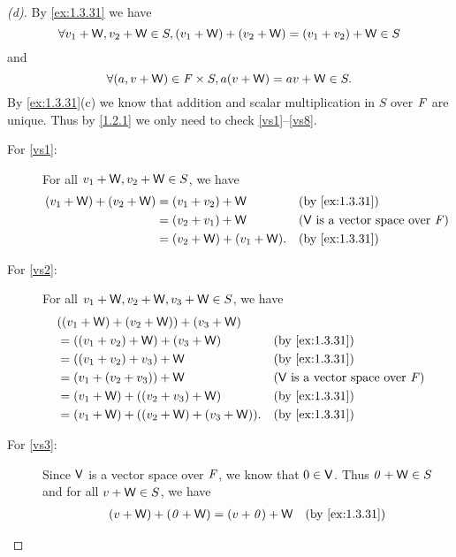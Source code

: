 \begin{proof}[(d)]
  By \cref{ex:1.3.31} we have
  \[
    \forall v_1 + \mathsf{W}, v_2 + \mathsf{W} \in S, (v_1 + \mathsf{W}) + (v_2 + \mathsf{W}) = (v_1 + v_2) + \mathsf{W} \in S
  \]
  and
  \[
    \forall (a, v + \mathsf{W}) \in \mathit{F} \times S, a(v + \mathsf{W}) = av + \mathsf{W} \in S.
  \]
  By \cref{ex:1.3.31}(c) we know that addition and scalar multiplication in \(S\) over \(\mathit{F}\) are unique.
  Thus by \cref{1.2.1} we only need to check \ref{vs1}--\ref{vs8}.
  \begin{description}
    \item[For \ref{vs1}:]
      For all \(v_1 + \mathsf{W}, v_2 + \mathsf{W} \in S\), we have
      \begin{align*}
        (v_1 + \W) + (v_2 + \W) & = (v_1 + v_2) + \W         &  & \text{(by \cref{ex:1.3.31})}                  \\
                                & = (v_2 + v_1) + \W         &  & \text{(\(\V\) is a vector space over \(\F\))} \\
                                & = (v_2 + \W) + (v_1 + \W). &  & \text{(by \cref{ex:1.3.31})}
      \end{align*}
    \item[For \ref{vs2}:]
      For all \(v_1 + \mathsf{W}, v_2 + \mathsf{W}, v_3 + \mathsf{W} \in S\), we have
      \begin{align*}
         & ((v_1 + \W) + (v_2 + \W)) + (v_3 + \W)                                                       \\
         & = ((v_1 + v_2) + \W) + (v_3 + \W)         &  & \text{(by \cref{ex:1.3.31})}                  \\
         & = ((v_1 + v_2) + v_3) + \W                &  & \text{(by \cref{ex:1.3.31})}                  \\
         & = (v_1 + (v_2 + v_3)) + \W                &  & \text{(\(\V\) is a vector space over \(\F\))} \\
         & = (v_1 + \W) + ((v_2 + v_3) + \W)         &  & \text{(by \cref{ex:1.3.31})}                  \\
         & = (v_1 + \W) + ((v_2 + \W) + (v_3 + \W)). &  & \text{(by \cref{ex:1.3.31})}
      \end{align*}
    \item[For \ref{vs3}:]
      Since \(\mathsf{V}\) is a vector space over \(\mathit{F}\), we know that \(0 \in \mathsf{V}\).
      Thus \(\mathit{0} + \mathsf{W} \in S\) and for all \(v + \mathsf{W} \in S\), we have
      \begin{align*}
        (v + \W) + (\zv + \W) & = (v + \zv) + \W &  & \text{(by \cref{ex:1.3.31})}                  \\

\end{align*}
\end{description}
\end{proof}
